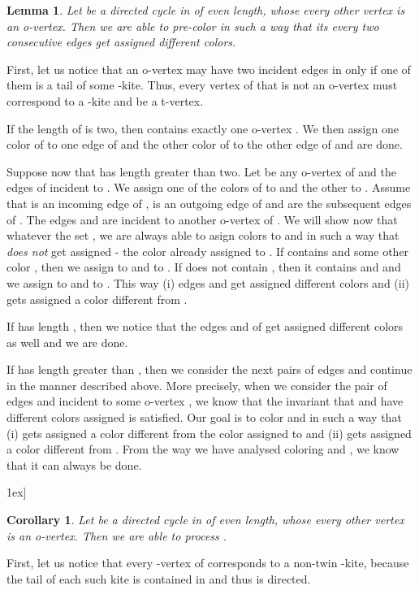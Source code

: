 \documentclass[a4, 11pt]{article}
\newcommand{\dowod}{\noindent{\bf Proof.~}}
\newcommand{\koniec}{\hfill \.1ex]}
\newcommand{\<}{\langle}
\renewcommand{\>}{\rangle}
\newtheorem{lemma}{Lemma}
\newtheorem{corollary}{Corollary}
\begin{document}
\begin{lemma}\label{preparz}
Let  be a  directed cycle in  of even length,   whose every other vertex is an o-vertex. Then we are able to pre-color   in such a way that its every two consecutive edges get assigned different colors.
\end{lemma}
\dowod

First, let us notice that  an o-vertex  may have two incident edges in  only if one of them is a tail of some -kite. Thus, every vertex  of  that is not an o-vertex must correspond to a -kite and be a t-vertex.

If the length of  is two, then  contains exactly one o-vertex . We then assign one  color of  to one edge of  and the other color of  to the other edge of  and are done. 

Suppose now that  has length greater than two. Let  be any o-vertex of  and  the edges of  incident
to . We assign one of the colors  of  to  and the other  to . Assume that  is an incoming edge of ,  is an outgoing edge of   and  are the subsequent edges of . The edges  and  are incident
 to another o-vertex  of . We will show now that whatever the set , we are always able to asign colors to  and  in such a way that  {\em does not} get assigned  - the color already assigned to . If  contains  and some other color , then we assign  to  and  to . If  does not contain , then it contains  and  and we assign  to  and  to . This way (i)  edges  and   get assigned  different colors
and (ii)  gets assigned a color different from . 

If  has length , then we notice that the edges  and   of  get assigned different colors as well and we are done.

If  has length greater than , then we consider the next pairs of edges and continue in the manner described above.  More precisely, when we consider the pair of edges  and  incident to some o-vertex ,
we know that the invariant that  and  have different colors assigned is satisfied. Our goal is to color  and  in such a way that (i)  gets assigned a color different from the color assigned to  and (ii)  gets assigned a color different from . From the way we have analysed coloring  and , we know that it can always be done.
 
\koniec 

\begin{corollary} \label{cyklparz}
Let  be a  directed cycle in  of even length,   whose every other vertex is an o-vertex. Then we are able to process  .
\end{corollary}
\dowod First, let us notice that every -vertex of  corresponds to a non-twin -kite, because the tail of each such kite is contained in  and thus is directed. 
\end{document}
